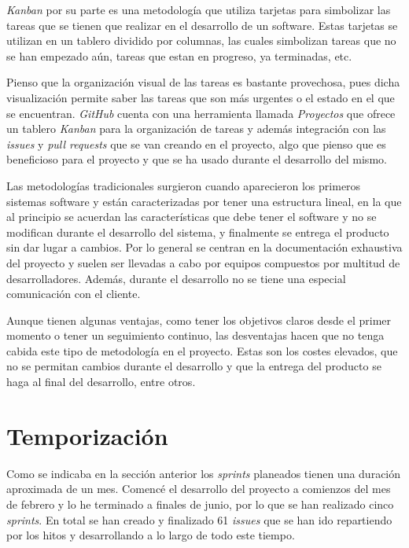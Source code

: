 \textit{Kanban} por su parte es una metodología que utiliza tarjetas para simbolizar las tareas que se tienen que realizar en el desarrollo de un software. Estas tarjetas se utilizan en un tablero dividido por columnas, las cuales simbolizan tareas que no se han empezado aún, tareas que estan en progreso, ya terminadas, etc.

Pienso que la organización visual de las tareas es bastante provechosa, pues dicha visualización permite saber las tareas que son más urgentes o el estado en el que se encuentran. \textit{GitHub} cuenta con una herramienta llamada \textit{Proyectos} que ofrece un tablero \textit{Kanban} para la organización de tareas y además integración con las \textit{issues} y \textit{pull requests} que se van creando en el proyecto, algo que pienso que es beneficioso para el proyecto y que se ha usado durante el desarrollo del mismo.

Las metodologías tradicionales surgieron cuando aparecieron los primeros sistemas software y están caracterizadas por tener una estructura lineal, en la que al principio se acuerdan las características que debe tener el software y no se modifican durante el desarrollo del sistema, y finalmente se entrega el producto sin dar lugar a cambios. Por lo general se centran en la documentación exhaustiva del proyecto y suelen ser llevadas a cabo por equipos compuestos por multitud de desarrolladores. Además, durante el desarrollo no se tiene una especial comunicación con el cliente.

Aunque tienen algunas ventajas, como tener los objetivos claros desde el primer momento o tener un seguimiento continuo, las desventajas hacen que no tenga cabida este tipo de metodología en el proyecto. Estas son los costes elevados, que no se permitan cambios durante el desarrollo y que la entrega del producto se haga al final del desarrollo, entre otros.


\section{Temporización}

Como se indicaba en la sección anterior los \textit{sprints} planeados tienen una duración aproximada de un mes. Comencé el desarrollo del proyecto a comienzos del mes de febrero y lo he terminado a finales de junio, por lo que se han realizado cinco \textit{sprints}. En total se han creado y finalizado 61 \textit{issues} que se han ido repartiendo por los hitos y desarrollando a lo largo de todo este tiempo. 

